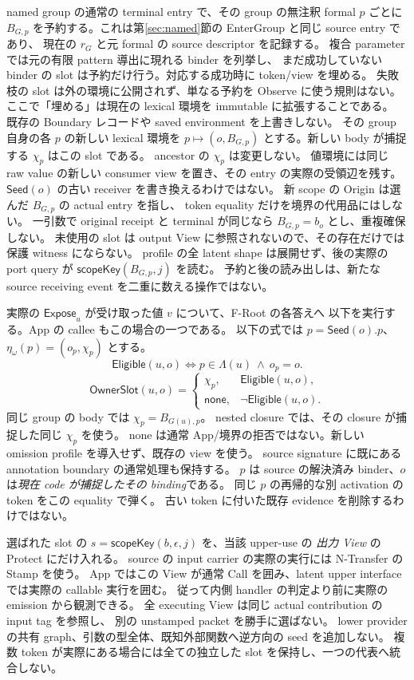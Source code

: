 \documentclass[11pt,a4paper]{article}
\begin{document}
named group の通常の terminal entry で、その group の無注釈 formal \(p\) ごとに
\(B_{G,p}\) を予約する。これは第\ref{sec:named}節の EnterGroup と同じ source entry であり、
現在の \(r_G\) と元 formal の source descriptor を記録する。
複合 parameter では元の有限 pattern 導出に現れる binder を列挙し、
まだ成功していない binder の slot は予約だけ行う。対応する成功時に token/view を埋める。
失敗枝の slot は外の環境に公開されず、単なる予約を Observe に使う規則はない。
ここで「埋める」は現在の lexical 環境を immutable に拡張することである。
既存の Boundary レコードや saved environment を上書きしない。
その group 自身の各 \(p\) の新しい lexical 環境を
\(p\mapsto(o,B_{G,p})\) とする。新しい body が捕捉する \(\chi_p\) はこの slot である。
ancestor の \(\chi_p\) は変更しない。
値環境には同じ raw value の新しい consumer view を置き、その entry の実際の受領辺を残す。
\(\mathsf{Seed}(o)\) の古い receiver を書き換えるわけではない。
新 scope の Origin は選んだ \(B_{G,p}\) の actual entry を指し、
token equality だけを境界の代用品にはしない。
一引数で original receipt と terminal が同じなら \(B_{G,p}=b_o\) とし、重複確保しない。
未使用の slot は output View に参照されないので、その存在だけでは保護 witness にならない。
profile の全 latent shape は展開せず、後の実際の port query が \(\mathsf{scopeKey}(B_{G,p},j)\) を読む。
予約と後の読み出しは、新たな source receiving event を二重に数える操作ではない。

実際の \(\mathsf{Expose}_u\) が受け取った値 \(v\) について、F-Root の各答えへ
以下を実行する。App の callee もこの場合の一つである。
以下の式では \(p=\mathsf{Seed}(o).p\)、\(\eta_\omega(p)=(o_p,\chi_p)\) とする。
\[
 \mathsf{Eligible}(u,o)\iff p\in\Lambda(u)\ \land\ o_p=o.
\]
\[
 \mathsf{OwnerSlot}(u,o)=
 \begin{cases}
 \chi_p,&\mathsf{Eligible}(u,o),\\
 \mathsf{none},&\neg\mathsf{Eligible}(u,o).
 \end{cases}
 \tag{F-Owner}
\]
同じ group の body では \(\chi_p=B_{G(u),p}\)。
nested closure では、その closure が捕捉した同じ \(\chi_p\) を使う。
none は通常 App/境界の拒否ではない。新しい omission profile を導入せず、既存の view を使う。
source signature に既にある annotation boundary の通常処理も保持する。
\(p\) は source の解決済み binder、\(o\) は\emph{現在 code が捕捉したその binding}である。
同じ \(p\) の再帰的な別 activation の token をこの equality で弾く。
古い token に付いた既存 evidence を削除するわけではない。

選ばれた slot の \(s=\mathsf{scopeKey}(b,\epsilon,j)\) を、当該 upper-use の
\emph{出力 View} の Protect にだけ入れる。
source の input carrier の実際の実行には N-Transfer の Stamp を使う。
App ではこの View が通常 Call を囲み、latent upper interface では実際の callable 実行を囲む。
従って内側 handler の判定より前に実際の emission から観測できる。
全 executing View は同じ actual contribution の input tag を参照し、
別の unstamped packet を勝手に選ばない。
lower provider の共有 graph、引数の型全体、既知外部関数へ逆方向の seed を追加しない。
複数 token が実際にある場合には全ての独立した slot を保持し、一つの代表へ統合しない。
\end{document}
